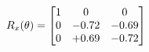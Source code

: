 \documentclass[preview]{standalone}
\begin{document}
\begin{align*}
\special{dvisvgm:raw <g id='unique000'>}R_{x}(\theta) = \begin{bmatrix}1 & 0 & 0 \\0 & -0.72 & -0.69 \\0 & +0.69 & -0.72\end{bmatrix}\special{dvisvgm:raw </g>}
\end{align*}
\end{document}
